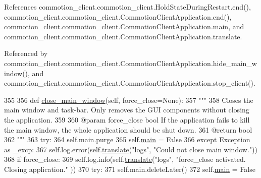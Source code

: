 References commotion\-\_\-client.\-commotion\-\_\-client.\-Hold\-State\-During\-Restart.\-end(), commotion\-\_\-client.\-commotion\-\_\-client.\-Commotion\-Client\-Application.\-end(), commotion\-\_\-client.\-commotion\-\_\-client.\-Commotion\-Client\-Application.\-main, and commotion\-\_\-client.\-commotion\-\_\-client.\-Commotion\-Client\-Application.\-translate.



Referenced by commotion\-\_\-client.\-commotion\-\_\-client.\-Commotion\-Client\-Application.\-hide\-\_\-main\-\_\-window(), and commotion\-\_\-client.\-commotion\-\_\-client.\-Commotion\-Client\-Application.\-stop\-\_\-client().


\begin{DoxyCode}
355 
356     \textcolor{keyword}{def }\hyperlink{classcommotion__client_1_1commotion__client_1_1CommotionClientApplication_ac3f5efd893879314eb1fbcf7e4d90192}{close\_main\_window}(self, force\_close=None):
357         \textcolor{stringliteral}{"""}
358 \textcolor{stringliteral}{        Closes the main window and task-bar. Only removes the GUI components without closing the
       application.}
359 \textcolor{stringliteral}{}
360 \textcolor{stringliteral}{        @param force\_close bool If the application fails to kill the main window, the whole application
       should be shut down.}
361 \textcolor{stringliteral}{        @return bool}
362 \textcolor{stringliteral}{        """}
363         \textcolor{keywordflow}{try}:
364             self.main.purge
365             self.\hyperlink{classcommotion__client_1_1commotion__client_1_1CommotionClientApplication_a4ae692cf60dc0a935cf2e8a72f657d1a}{main} = \textcolor{keyword}{False}
366         \textcolor{keywordflow}{except} Exception \textcolor{keyword}{as} \_excp:
367             self.log.error(self.\hyperlink{classcommotion__client_1_1commotion__client_1_1CommotionClientApplication_a57e951c9b241fb0e0c70055b4ca1b6f7}{translate}(\textcolor{stringliteral}{"logs"}, \textcolor{stringliteral}{"Could not close main window."}))
368             \textcolor{keywordflow}{if} force\_close:
369                 self.log.info(self.\hyperlink{classcommotion__client_1_1commotion__client_1_1CommotionClientApplication_a57e951c9b241fb0e0c70055b4ca1b6f7}{translate}(\textcolor{stringliteral}{"logs"}, \textcolor{stringliteral}{"force\_close activated. Closing application."}
      ))
370                 \textcolor{keywordflow}{try}:
371                     self.main.deleteLater()
372                     self.\hyperlink{classcommotion__client_1_1commotion__client_1_1CommotionClientApplication_a4ae692cf60dc0a935cf2e8a72f657d1a}{main} = \textcolor{keyword}{False}

\end{DoxyCode}
